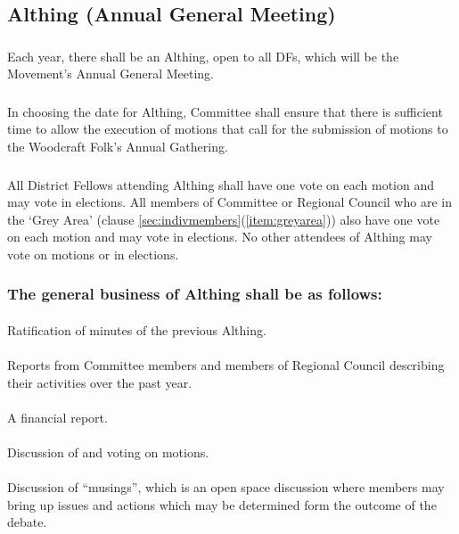 \documentclass[a4paper, 12pt]{report}
\begin{document}
\subsection{Althing (Annual General Meeting)}
\label{sec:althing}
\subsubsection{}
Each year, there shall be an Althing, open to all DFs, which will be the Movement's Annual General Meeting.
\subsubsection{}
In choosing the date for Althing, Committee shall ensure that there is sufficient time to allow the execution of motions that call for the submission of motions to the Woodcraft Folk's Annual Gathering.
\subsubsection{}
All District Fellows attending Althing shall have one vote on each motion and may vote in elections. All members of Committee or Regional Council who are in the `Grey Area' (clause \ref{sec:indivmembers}(\ref{item:greyarea})) also have one vote on each motion and may vote in elections. No other attendees of Althing may vote on motions or in elections.
\subsubsection{The general business of Althing shall be as follows:}
\paragraph{}
Ratification of minutes of the previous Althing.
\paragraph{}
Reports from Committee members and members of Regional Council describing their activities over the past year.
\paragraph{}
A financial report.
\paragraph{}
Discussion of and voting on motions.
\paragraph{}
Discussion of ``musings'', which is an open space discussion where members may bring up issues and actions which may be determined form the outcome of the debate.
\end{document}
